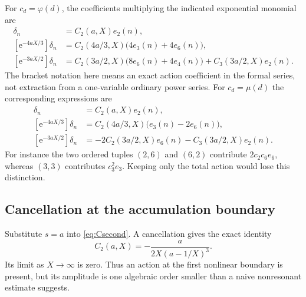 \documentclass[11pt,a4paper]{article}
\numberwithin{equation}{section}
\theoremstyle{definition}
\theoremstyle{remark}
\newcommand{\ee}{\mathrm e}
\begin{document}
For $c_d=\varphi(d)$, the coefficients multiplying the indicated
exponential monomial are
\begin{align}
 [\ee^{-aX}]\delta_n&=C_2(a,X)e_2(n),\nonumber\\
 [\ee^{-4aX/3}]\delta_n
 &=C_2(4a/3,X)\bigl(4e_3(n)+4e_6(n)\bigr),\label{eq:phicollisions}\\
 [\ee^{-3aX/2}]\delta_n
 &=C_2(3a/2,X)\bigl(8e_6(n)+4e_4(n)\bigr)
   +C_3(3a/2,X)e_2(n).\nonumber
\end{align}
The bracket notation here means an exact action coefficient in the
formal series, not extraction from a one-variable ordinary power series.
For $c_d=\mu(d)$ the corresponding expressions are
\begin{align}
 [\ee^{-aX}]\delta_n&=C_2(a,X)e_2(n),\nonumber\\
 [\ee^{-4aX/3}]\delta_n
 &=C_2(4a/3,X)\bigl(e_3(n)-2e_6(n)\bigr),\label{eq:mucollisions}\\
 [\ee^{-3aX/2}]\delta_n
 &=-2C_2(3a/2,X)e_6(n)-C_3(3a/2,X)e_2(n).\nonumber
\end{align}
For instance the two ordered tuples $(2,6)$ and $(6,2)$ contribute
$2c_2c_6e_6$, whereas $(3,3)$ contributes $c_3^2e_3$.
Keeping only the total action would lose this distinction.

\subsection{Cancellation at the accumulation boundary}

Substitute $s=a$ into \eqref{eq:Csecond}. A cancellation gives the
exact identity
\begin{equation}
 C_2(a,X)=-\frac{a}{2X(a-1/X)^3}.
 \label{eq:boundarykernel}
\end{equation}
Its limit as $X\to\infty$ is zero. Thus an action at the first
nonlinear boundary is present, but its amplitude is one algebraic order
smaller than a naive nonresonant estimate suggests.
\end{document}
